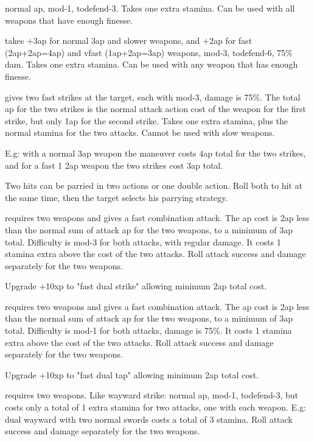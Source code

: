  normal ap, mod-1, todefend-3. Takes one extra stamina. Can be used with all weapons that have enough finesse.


 takes +3ap for normal 3ap and slower weapons, and +2ap for fast (2ap+2ap=4ap) and vfast (1ap+2ap=3ap) weapons, mod-3, todefend-6, 75\% dam. Takes one extra stamina. Can be used with any weapon that has enough finesse.


 gives two fast strikes at the target, each with mod-3, damage is 75\%. The total ap for the two strikes is the normal attack action cost of the weapon for the first strike, but only 1ap for the second strike. Takes one extra stamina, plus the normal stamina for the two attacks. Cannot be used with slow weapons.

E.g: with a normal 3ap weapon the maneuver costs 4ap total for the two strikes, and for a fast 1 2ap weapon the two strikes cost 3ap total.

Two hits can be parried in two actions or one double action. Roll both to hit at the same time, then the target selects his parrying strategy.


 requires two weapons and gives a fast combination attack. The ap cost is 2ap less than the normal sum of attack ap for the two weapons, to a minimum of 3ap total. Difficulty is mod-3 for both attacks, with regular damage. It costs 1 stamina extra above the cost of the two attacks.
Roll attack success and damage separately for the two weapons.

\noindent Upgrade +10xp to "fast dual strike" allowing minimum 2ap total cost.


 requires two weapons and gives a fast combination attack. The ap cost is 2ap less than the normal sum of attack ap for the two weapons, to a minimum of 3ap total. Difficulty is mod-1 for both attacks, damage is 75\%. It costs 1 stamina extra above the cost of the two attacks.
Roll attack success and damage separately for the two weapons.

\noindent Upgrade +10xp to "fast dual tap" allowing minimum 2ap total cost.


 requires two weapons. Like wayward strike: normal ap, mod-1, todefend-3, but costs only a total of 1 extra stamina for two attacks, one with each weapon. E.g: dual wayward with two normal swords costs a total of 3 stamina.
Roll attack success and damage separately for the two weapons.


